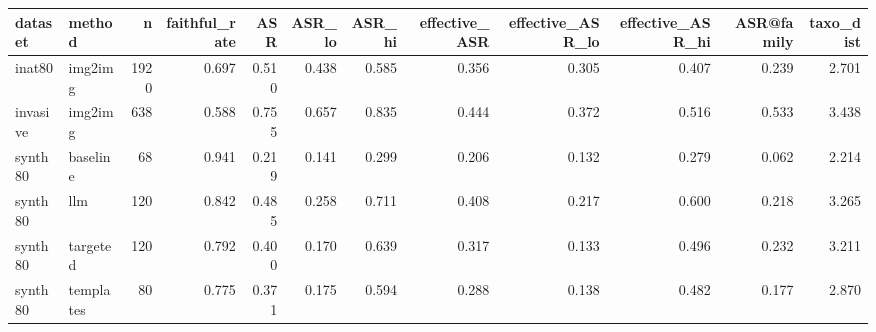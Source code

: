 \begin{tabular}{llrrrrrrrrrr}
\toprule
dataset & method & n & faithful_rate & ASR & ASR_lo & ASR_hi & effective_ASR & effective_ASR_lo & effective_ASR_hi & ASR@family & taxo_dist \\
\midrule
inat80 & img2img & 1920 & 0.697 & 0.510 & 0.438 & 0.585 & 0.356 & 0.305 & 0.407 & 0.239 & 2.701 \\
invasive & img2img & 638 & 0.588 & 0.755 & 0.657 & 0.835 & 0.444 & 0.372 & 0.516 & 0.533 & 3.438 \\
synth80 & baseline & 68 & 0.941 & 0.219 & 0.141 & 0.299 & 0.206 & 0.132 & 0.279 & 0.062 & 2.214 \\
synth80 & llm & 120 & 0.842 & 0.485 & 0.258 & 0.711 & 0.408 & 0.217 & 0.600 & 0.218 & 3.265 \\
synth80 & targeted & 120 & 0.792 & 0.400 & 0.170 & 0.639 & 0.317 & 0.133 & 0.496 & 0.232 & 3.211 \\
synth80 & templates & 80 & 0.775 & 0.371 & 0.175 & 0.594 & 0.288 & 0.138 & 0.482 & 0.177 & 2.870 \\
\bottomrule
\end{tabular}
